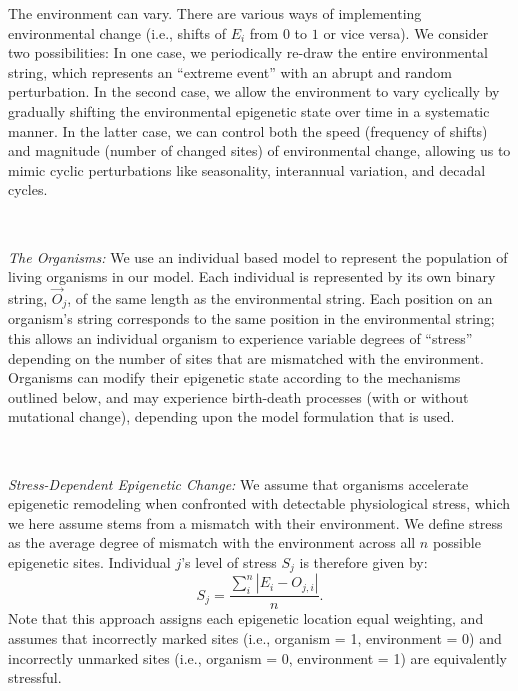 \documentclass{article}
\begin{document}
The environment can vary. There are various ways of implementing environmental change (i.e., shifts of $E_i$ from $0$ to $1$ or vice versa). We consider two possibilities: In one case, we periodically re-draw the entire environmental string, which represents an ``extreme event'' with an abrupt and random perturbation. In the second case, we allow the environment to vary cyclically by gradually shifting the environmental epigenetic state over time in a systematic manner. In the latter case, we can control both the speed (frequency of shifts) and magnitude (number of changed sites) of environmental change, allowing us to mimic cyclic perturbations like seasonality, interannual variation, and decadal cycles.

\ 


\noindent \textit{The Organisms:} We use an individual based model to represent the population of living organisms in our model. Each individual is represented by its own binary string, $\vec{O}_j$, of the same length as the environmental string. Each position on an organism's string corresponds to the same position in the environmental string; this allows an individual organism to experience variable degrees of ``stress'' depending on the number of sites that are mismatched with the environment. Organisms can modify their epigenetic state according to the mechanisms outlined below, and may experience birth-death processes (with or without mutational change), depending upon the model formulation that is used. %

\ 

\noindent \textit{Stress-Dependent Epigenetic Change:} We assume that organisms accelerate epigenetic remodeling when confronted with detectable physiological stress, which we here assume stems from a mismatch with their environment. We define stress as the average degree of mismatch with the environment across all $n$ possible epigenetic sites. Individual $j$'s level of stress $S_j$ is therefore given by:
\begin{equation}
   S_j = \frac{\sum_i ^n | E_i - O_{j,i} |}{n} .
\end{equation}
Note that this approach assigns each epigenetic location equal weighting, and assumes that incorrectly marked sites (i.e., organism = 1, environment = 0) and incorrectly unmarked sites (i.e., organism = 0, environment = 1) are equivalently stressful.
\end{document}
